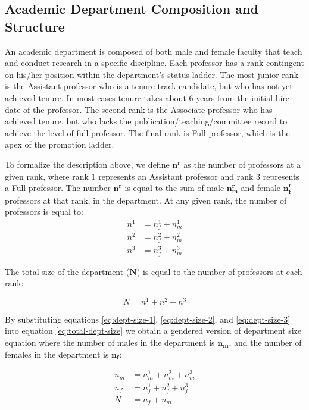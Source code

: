 \documentclass[12pt, a4paper, oneside, headinclude, footinclude,english]{article}
\begin{document}
\subsection{Academic Department Composition and Structure}
\label{sec:dept-structure}

An academic department is composed of both male and female faculty that teach
and conduct research in a specific discipline. Each professor has a rank
contingent on his/her position within the department's status ladder. The most junior rank
is the Assistant professor who is a tenure-track candidate, but who has not yet
achieved tenure. In most cases tenure takes about 6 years from the initial hire
date of the professor. The second rank is the Associate professor who has
achieved tenure, but who lacks the publication/teaching/committee
record to achieve the level of full professor. The final rank is Full professor,
which is the apex of the promotion ladder.

To formalize the description above, we define $\bm{n^r}$ as the number of professors
at a given rank, where rank $1$ represents an Assistant professor and rank $3$ represents
a Full professor. The number $\bm{n^r}$ is equal to the sum of male $\bm{n_m^r}$ and
female $\bm{n_f^r}$ professors at that rank, in the department. At any given rank,
the number of professors is equal to:
\begin{align}
  n^1 & = n^1_f + n^1_m \label{eq:dept-size-1} \\
  n^2 & = n^2_f + n^2_m  \label{eq:dept-size-2} \\
  n^3 & = n^3_f + n^3_m \label{eq:dept-size-3}
\end{align}

The total size of the department ($\bm{N}$) is equal to the number of professors at
each rank:

\begin{equation}
  \label{eq:total-dept-size}
  N = n^1 + n^2 + n^3
\end{equation}

By substituting equations
\ref{eq:dept-size-1}, \ref{eq:dept-size-2}, and \ref{eq:dept-size-3} into equation \ref{eq:total-dept-size} we obtain a
gendered version of department size equation where the number of males in the
department is $\bm{n_m}$, and the number of females in the department is $\bm{n_f}$:

\begin{align}
  n_m &= n^1_m + n^2_m + n^3_m  \label{eq:female-number} \\
  n_f &= n^1_f + n^2_f + n^3_f  \label{eq:male-number} \\
  N &= n_f + n_m  \label{eq:total-gender-dept-size}
\end{align}
\end{document}
